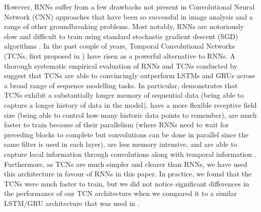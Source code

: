 \documentclass[fleqn,usenatbib]{mnras}
\begin{document}
However, RNNs suffer from a few drawbacks not present in Convolutional Neural Network (CNN) approaches that have been so successful in image analysis and a range of other groundbreaking problems. Most notably, RNNs are notoriously slow and difficult to train using standard stochastic gradient descent (SGD) algorithms \citep{Pascanu2014,Bai2018}. In the past couple of years, Temporal Convolutional Networks (TCNs, first proposed in \citealt{Lea2016}) have risen as a powerful alternative to RNNs. A thorough systematic empirical evaluation of RNNs and TCNs conducted by \citet{Bai2018} suggest that TCNs are able to convincingly outperform LSTMs and GRUs across a broad range of sequence modelling tasks. In particular, \citet{Bai2018} demonstrates that TCNs exhibit a substantially longer memory of sequential data (being able to capture a longer history of data in the model), have a more flexible receptive field size (being able to control how many historic data points to remember), are much faster to train because of their parallelism (where RNNs need to wait for preceding blocks to complete but convolutions can be done in parallel since the same filter is used in each layer), are less memory intensive, and are able to capture local information through convolutions along with temporal information \citep{Kalchbrenner2016,Lea2016,Bai2018}. Furthermore, as TCNs are much simpler and clearer than RNNs, we have used this architecture in favour of RNNs in this paper. In practice, we found that the TCNs were much faster to train, but we did not notice significant differences in the performance of our TCN architecture when we compared it to a similar LSTM/GRU architecture that was used in \citet{Muthukrishna19RAPID}.
\end{document}
